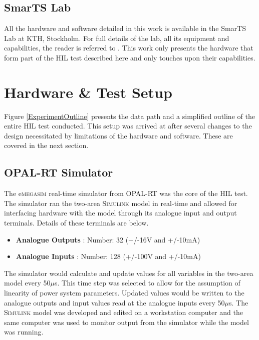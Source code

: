 \documentclass[conference]{IEEEtran}
\begin{document}
\subsection{SmarTS Lab}
All the hardware and software detailed in this work is available in the SmarTS Lab at KTH, Stockholm. For full details of the lab, all its equipment and capabilities, the reader is referred to \cite{SmarTSLab}. This work only presents the hardware that form part of the HIL test described here and only touches upon their capabilities.

\section{Hardware \& Test Setup}\label{hardware}

Figure \ref{ExperimentOutline} presents the data path and a simplified outline of the entire HIL test conducted. This setup was arrived at after several changes to the design necessitated by limitations of the hardware and software. These are covered in the next section.

\subsection{OPAL-RT Simulator}
The e\textsc{megasim}\cite{eMEGASIM} real-time simulator from OPAL-RT\cite{OPALemegasim} was the core of the HIL test. The simulator ran the two-area \textsc{Simulink} model in real-time and allowed for interfacing hardware with the model through its analogue input and output terminals.  Details of these terminals are below.

\begin{itemize}
\item \textbf{Analogue Outputs} : Number: 32 (+/-16V and +/-10mA)
\item \textbf{Analogue Inputs} : Number: 128 (+/-100V and +/-10mA)
\end{itemize}

The simulator would calculate and update values for all variables in the two-area model every 50$\mu$s. This time step was selected to allow for the assumption of linearity of power system parameters. Updated values would be written to the analogue outputs and input values read at the analogue inputs every 50$\mu$s. The \textsc{Simulink} model was developed and edited on a workstation computer and the same computer was used to monitor output from the simulator while the model was running.
\end{document}
